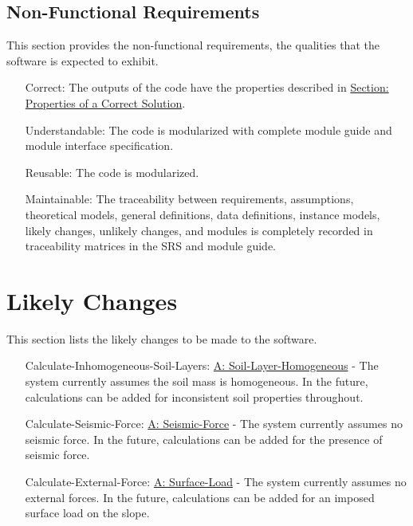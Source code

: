 \documentclass[12pt]{article}
\begin{document}
\subsection{Non-Functional Requirements}
\label{Sec:NFRs}
This section provides the non-functional requirements, the qualities that the software is expected to exhibit.

\begin{itemize}
\item[Correct:\phantomsection\label{correct}]{The outputs of the code have the properties described in \hyperref[Sec:CorSolProps]{Section: Properties of a Correct Solution}.}
\item[Understandable:\phantomsection\label{understandable}]{The code is modularized with complete module guide and module interface specification.}
\item[Reusable:\phantomsection\label{reusable}]{The code is modularized.}
\item[Maintainable:\phantomsection\label{maintainable}]{The traceability between requirements, assumptions, theoretical models, general definitions, data definitions, instance models, likely changes, unlikely changes, and modules is completely recorded in traceability matrices in the SRS and module guide.}
\end{itemize}
\section{Likely Changes}
\label{Sec:LCs}
This section lists the likely changes to be made to the software.

\begin{itemize}
\item[Calculate-Inhomogeneous-Soil-Layers:\phantomsection\label{LC_inhomogeneous}]{\hyperref[assumpSLH]{A: Soil-Layer-Homogeneous} - The system currently assumes the soil mass is homogeneous. In the future, calculations can be added for inconsistent soil properties throughout.}
\item[Calculate-Seismic-Force:\phantomsection\label{LC_seismic}]{\hyperref[assumpSF]{A: Seismic-Force} - The system currently assumes no seismic force. In the future, calculations can be added for the presence of seismic force.}
\item[Calculate-External-Force:\phantomsection\label{LC_external}]{\hyperref[assumpSL]{A: Surface-Load} - The system currently assumes no external forces. In the future, calculations can be added for an imposed surface load on the slope.}
\end{itemize}
\end{document}
